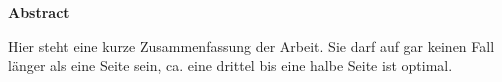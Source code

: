 \vspace*{2cm}

\begin{center}
    \textbf{Abstract}
\end{center}

\vspace*{1cm}

\noindent Hier steht eine kurze Zusammenfassung der Arbeit. Sie darf auf gar keinen Fall
länger als eine Seite sein, ca. eine drittel bis eine halbe Seite ist optimal.

